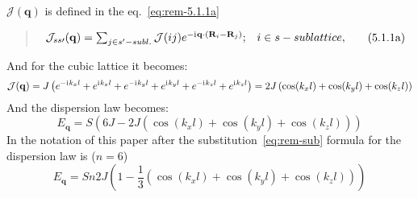     $\mathcal{J}(\mathbf{q})$ is defined in the eq.~\eqref{eq:rem-5.1.1a}
    \begin{quote}
        \begin{equation}
            \begin{matrix}
                \mathcal{J}_{ss\prime}(\mathbf{q}) = \sum_{j \in s^{\prime} - subl.} \mathcal{J}(ij)e^{-\mathrm{i}\mkern1mu\mathbf{q}\cdot(\mathbf{R}_i - \mathbf{R}_j)}; & i \in s-sublattice,
            \end{matrix}  
            \label{eq:rem-5.1.1a} \tag{5.1.1a}
        \end{equation}
    \end{quote}
    And for the cubic lattice it becomes:
    \begin{equation}
        \mathcal{J}(\mathbf{q}) = J \left(e^{-\mathrm{i}\mkern1mu k_xl} + e^{\mathrm{i}\mkern1mu k_xl} + e^{-\mathrm{i}\mkern1mu k_yl} + e^{\mathrm{i}\mkern1mu k_yl} + e^{-\mathrm{i}\mkern1mu k_zl} + e^{\mathrm{i}\mkern1mu k_zl}\right) = 2J \left(\cos(k_xl) + \cos(k_yl) + \cos(k_zl)\right)
    \end{equation}
    And the dispersion law becomes:
    \begin{equation}
        E_{\mathbf{q}} = S(6J - 2J \left(\cos(k_xl) + \cos(k_yl) + \cos(k_zl)\right))
    \end{equation}
    In the notation of this paper after the substitution~\eqref{eq:rem-sub} formula for the dispersion law is ($n = 6$)
    \begin{equation}
        E_{\mathbf{q}} = Sn2J(1 - \dfrac{1}{3} \left(\cos(k_xl) + \cos(k_yl) + \cos(k_zl)\right))
    \end{equation}

     




